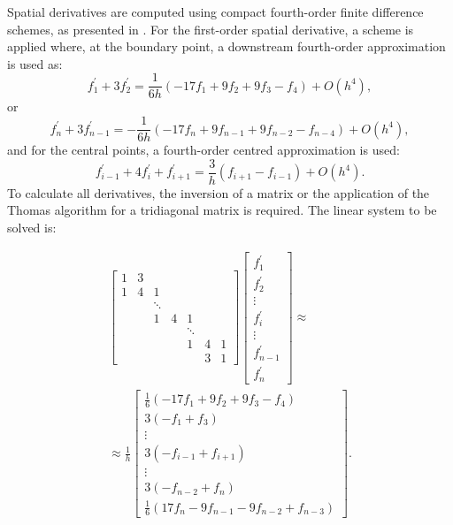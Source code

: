 \documentclass[preprint, 12pt]{elsarticle}
\begin{document}
Spatial derivatives are computed using compact fourth-order finite difference schemes, as presented in \citet{souza2003}. For the first-order spatial derivative, a scheme is applied where, at the boundary point, a downstream fourth-order approximation is used as:
\begin{equation}
    f_1^{\prime}+3 f_2^{\prime}=\frac{1}{ 6h}\left(-17f_1 + 9f_2 + 9f_3 - f_4 \right)+O\left(h^4\right),
\end{equation}
or
\begin{equation}
    f_n^{\prime} + 3f_{n-1}^{\prime} = -\frac{1}{ 6h}\left(-17f_{n} + 9f_{n-1} + 9f_{n-2} - f_{n-4} \right)+O\left(h^4\right),
\end{equation}
and for the central points, a fourth-order centred approximation is used:
\begin{equation}
    f_{i-1}^{\prime}+4 f_i^{\prime}+f_{i+1}^{\prime} = \frac{3}{ h}\left(f_{i+1}-f_{i-1}\right) +O\left(h^4\right).
\end{equation}
To calculate all derivatives, the inversion of a matrix or the application of
the Thomas algorithm \cite{thomas1949} for a tridiagonal matrix is required.
{\color{red} The linear system to be solved is:}

\begin{align}
\left[\begin{array}{ccccccc}
    1 & 3 & & & & & \\
    1 & 4 & 1 & & & & \\
    & & \ddots & & & & \\
    & & 1 & 4 & 1 & & \\
    & & & & \ddots & & \\
    & & & & 1 & 4 & 1 \\
    & & & & & 3 & 1
\end{array}\right]\left[\begin{array}{c}
f_1^{\prime} \\
f_2^{\prime} \\
\vdots \\
f_i^{\prime} \\
\vdots \\
f_{n-1}^{\prime} \\
f_n^{\prime}
\end{array}\right] 
\approx \nonumber\\ \approx \frac{1}{h}\left[\begin{array}{c}\frac{1}{6}\left(-17f_1 + 9f_2 + 9f_3 - f_4 \right) \\ 3(- f_1 + f_3) \\ \vdots \\ 3\left(-f_{i-1}+f_{i+1}\right) \\ \vdots \\ 3\left(-f_{n-2}+f_{n}\right) \\ \frac{1}{6}\left(17f_n - 9f_{n-1} - 9f_{n-2} + f_{n-3}\right)\end{array}\right].
\end{align}
\end{document}
